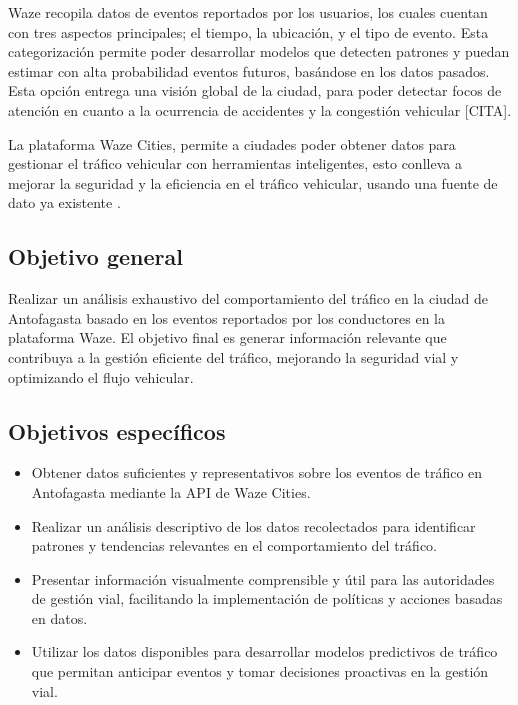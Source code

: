 \documentclass[12pt]{article}
\begin{document}
Waze recopila datos de eventos reportados por los usuarios, los cuales cuentan con tres aspectos principales; el tiempo, la ubicación, y el tipo de evento. Esta categorización permite poder desarrollar modelos que detecten patrones y puedan estimar con alta probabilidad eventos futuros, basándose en los datos pasados. Esta opción entrega una visión global de la ciudad, para poder detectar focos de atención en cuanto a la ocurrencia de accidentes y la congestión vehicular [CITA].

La plataforma Waze Cities, permite a ciudades poder obtener datos para gestionar el tráfico vehicular con herramientas inteligentes, esto conlleva a mejorar la seguridad y la eficiencia en el tráfico vehicular, usando una fuente de dato ya existente \citep{wazecitiescasestudies2024}.

\subsection{Objetivo general}

Realizar un análisis exhaustivo del comportamiento del tráfico en la ciudad de Antofagasta basado en los eventos reportados por los conductores en la plataforma Waze. El objetivo final es generar información relevante que contribuya a la gestión eficiente del tráfico, mejorando la seguridad vial y optimizando el flujo vehicular.

\subsection{Objetivos específicos}

\begin{itemize}
    \item Obtener datos suficientes y representativos sobre los eventos de tráfico en Antofagasta mediante la API de Waze Cities.
    \item Realizar un análisis descriptivo de los datos recolectados para identificar patrones y tendencias relevantes en el comportamiento del tráfico.
    \item Presentar información visualmente comprensible y útil para las autoridades de gestión vial, facilitando la implementación de políticas y acciones basadas en datos.
    \item Utilizar los datos disponibles para desarrollar modelos predictivos de tráfico que permitan anticipar eventos y tomar decisiones proactivas en la gestión vial.
\end{itemize}
\end{document}
